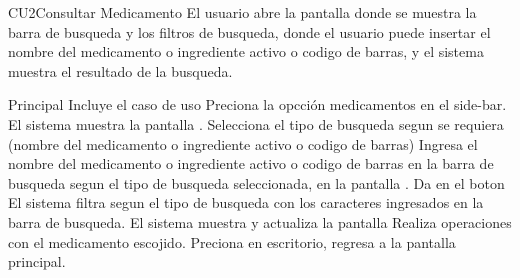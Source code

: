 \begin{UseCase}{CU2}{Consultar Medicamento}{
		 El usuario abre la pantalla  donde se muestra la barra de busqueda y los filtros de busqueda, donde el usuario puede insertar el nombre del medicamento o ingrediente activo o codigo de barras, y el sistema muestra el resultado de la busqueda.
	}
	\end{UseCase} 	
	\begin{UCtrayectoria}{Principal}
		\UCpaso Incluye el caso de uso 
		\UCpaso [\UCactor] Preciona la opcción medicamentos en el side-bar.
		\UCpaso El sistema muestra la pantalla .
		\UCpaso [\UCactor] Selecciona el tipo de busqueda segun se requiera (nombre del medicamento o ingrediente activo o codigo de barras)
		\UCpaso [\UCactor] Ingresa el nombre del medicamento o ingrediente activo o codigo de barras en la barra de busqueda segun el tipo de busqueda seleccionada, en la pantalla .		
		\UCpaso [\UCactor] Da en el boton 
		\UCpaso El sistema filtra segun el tipo de busqueda con los caracteres ingresados en la barra de busqueda.
		\UCpaso El sistema muestra y actualiza la pantalla  
		\UCpaso [\UCactor] Realiza operaciones con el medicamento escojido.
		\UCpaso [\UCactor] Preciona en escritorio, regresa a la pantalla principal.
	\end{UCtrayectoria}

